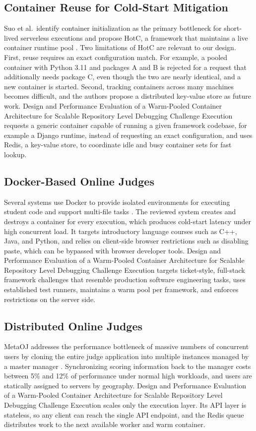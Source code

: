 \documentclass[conference]{IEEEtran}
\begin{document}
\subsection{Container Reuse for Cold-Start Mitigation}
Suo et al.\ identify container initialization as the primary bottleneck for short-lived serverless executions and propose HotC, a framework that maintains a live container runtime pool \cite{suo2021}. Two limitations of HotC are relevant to our design. First, reuse requires an exact configuration match. For example, a pooled container with Python 3.11 and packages A and B is rejected for a request that additionally needs package C, even though the two are nearly identical, and a new container is started. Second, tracking containers across many machines becomes difficult, and the authors propose a distributed key-value store as future work. Design and Performance Evaluation of a Warm-Pooled Container Architecture for Scalable Repository Level Debugging Challenge Execution requests a generic container capable of running a given framework codebase, for example a Django runtime, instead of requesting an exact configuration, and uses Redis, a key-value store, to coordinate idle and busy container sets for fast lookup.

\subsection{Docker-Based Online Judges}
Several systems use Docker to provide isolated environments for executing student code and support multi-file tasks \cite{docker_oj}. The reviewed system creates and destroys a container for every execution, which produces cold-start latency under high concurrent load. It targets introductory language courses such as C++, Java, and Python, and relies on client-side browser restrictions such as disabling paste, which can be bypassed with browser developer tools. Design and Performance Evaluation of a Warm-Pooled Container Architecture for Scalable Repository Level Debugging Challenge Execution targets ticket-style, full-stack framework challenges that resemble production software engineering tasks, uses established test runners, maintains a warm pool per framework, and enforces restrictions on the server side.

\subsection{Distributed Online Judges}
MetaOJ addresses the performance bottleneck of massive numbers of concurrent users by cloning the entire judge application into multiple instances managed by a master manager \cite{metaoj}. Synchronizing scoring information back to the manager costs between 5\% and 12\% of performance under normal high workloads, and users are statically assigned to servers by geography. Design and Performance Evaluation of a Warm-Pooled Container Architecture for Scalable Repository Level Debugging Challenge Execution scales only the execution layer. Its API layer is stateless, so any client can reach the single API endpoint, and the Redis queue distributes work to the next available worker and warm container.
\end{document}
